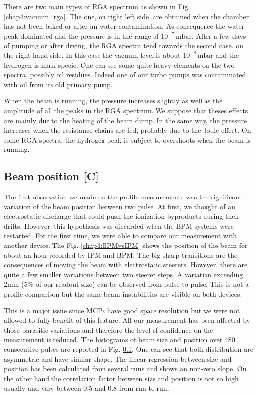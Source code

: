 \begin{refsection}
  There are two main types of RGA spectrum as shown in Fig. \ref{chap4:vacuum_rga}. The one, on right left side, are obtained when the chamber has not been baked or after an water contamination. As consequence the water peak dominated and the pressure is in the range of $10^{-7}\,\mathrm{mbar}$. After a few days of pumping or after drying, the RGA spectra tend towards the second case, on the right hand side. In this case the vacuum level is about $10^{-8}\,\mathrm{mbar}$ and the hydrogen is main specie. One can see some quite heavy elements on the two spectra, possibly oil residues. Indeed one of our turbo pumps was contaminated with oil from its old primary pump.

  

  When the beam is running, the pressure increases slightly as well as the amplitude of all the peaks in the RGA spectrum. We suppose that theses effects are mainly due to the heating of the beam dump. In the same way, the pressure increases when the resistance chains are fed, probably due to the Joule effect. On some RGA spectra, the hydrogen peak is subject to overshoots when the beam is running.

  \subsection{Beam position [C]}

  The first observation we made on the profile measurements was the significant variation of the beam position between two pulse. At first, we thought of an electrostatic discharge that could push the ionization byproducts during their drifts. However, this hypothesis was discarded when the BPM systems were restarted. For the first time, we were able to compare our measurement with another device. The Fig. \ref{chap4:BPMvsIPM} shows the position of the beam for about an hour recorded by IPM and BPM. The big sharp transitions are the consequences of moving the beam with electrostatic steerers. However, there are quite a few smaller variations between two steerer steps. A variation exceeding $2\mathrm{mm}$ ($5\mathrm{\%}$ of our readout size) can be observed from pulse to pulse. This is not a profile comparison but the same beam instabilities are visible on both devices.

  

  This is a major issue since MCPs have good space resolution but we were not allowed to fully benefit of this feature. All our measurement has been affected by those parasitic variations and therefore the level of confidence on the measurement is reduced. The histograms of beam size and position over 480 consecutive pulses are reported in Fig. \ref{}. One can see that both distribution are asymmetric and have similar shape. The linear regression between size and position has been calculated from several runs and shows an non-zero slope. On the other hand the correlation factor between size and position is not so high usually and vary between 0.5 and 0.8 from run to run.


\end{refsection}
